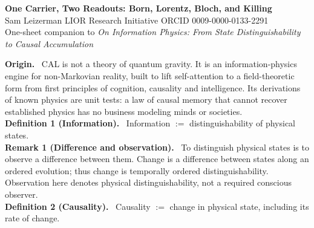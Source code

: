 \documentclass[9pt]{extarticle}
\begin{document}
\begin{center}
{\Large\bfseries\color{ink} One Carrier, Two Readouts: Born, Lorentz, Bloch, and Killing}\\[2pt]
{\small Sam Leizerman \;\textbullet\; LIOR Research Initiative \;\textbullet\; ORCID 0009-0000-0133-2291}\\[1pt]
{\small\color{note} One-sheet companion to \textit{On Information Physics: From State Distinguishability to Causal Accumulation}}
\end{center}
\vspace{-4pt}

\begin{tcolorbox}[colback=ink!4,colframe=ink!60,boxrule=0.5pt,left=5pt,right=5pt,top=3pt,bottom=3pt]
\small
\textbf{Origin.} \ CAL is not a theory of quantum gravity. It is an information-physics engine for non-Markovian reality, built to lift self-attention to a field-theoretic form from first principles of cognition, causality and intelligence. Its derivations of known physics are unit tests: a law of causal memory that cannot recover established physics has no business modeling minds or societies.\\[2pt]
\textbf{Definition 1 (Information).} \ Information $:=$ distinguishability of physical states.\\[2pt]
\textbf{Remark 1 (Difference and observation).} \ To distinguish physical states is to observe a difference between them. Change is a difference between states along an ordered evolution; thus change is temporally ordered distinguishability. Observation here denotes physical distinguishability, not a required conscious observer.\\[2pt]
\textbf{Definition 2 (Causality).} \ Causality $:=$ change in physical state, including its rate of change.
\end{tcolorbox}
\end{document}
